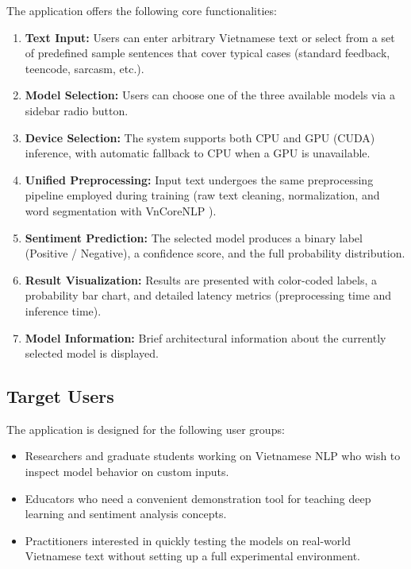 \documentclass[12pt]{report} %
\begin{document}
The application offers the following core functionalities:
\begin{enumerate}
    \item \textbf{Text Input:} Users can enter arbitrary Vietnamese text or select from a set of predefined sample sentences that cover typical cases (standard feedback, teencode, sarcasm, etc.).
    \item \textbf{Model Selection:} Users can choose one of the three available models via a sidebar radio button.
    \item \textbf{Device Selection:} The system supports both CPU and GPU (CUDA) inference, with automatic fallback to CPU when a GPU is unavailable.
    \item \textbf{Unified Preprocessing:} Input text undergoes the same preprocessing pipeline employed during training (raw text cleaning, normalization, and word segmentation with VnCoreNLP \cite{vu2018vncorenlp}).
    \item \textbf{Sentiment Prediction:} The selected model produces a binary label (Positive / Negative), a confidence score, and the full probability distribution.
    \item \textbf{Result Visualization:} Results are presented with color-coded labels, a probability bar chart, and detailed latency metrics (preprocessing time and inference time).
    \item \textbf{Model Information:} Brief architectural information about the currently selected model is displayed.
\end{enumerate}

\subsection{Target Users}
\label{subsec:target-users}

The application is designed for the following user groups:
\begin{itemize}
    \item Researchers and graduate students working on Vietnamese NLP who wish to inspect model behavior on custom inputs.
    \item Educators who need a convenient demonstration tool for teaching deep learning and sentiment analysis concepts.
    \item Practitioners interested in quickly testing the models on real-world Vietnamese text without setting up a full experimental environment.
\end{itemize}
\end{document}

